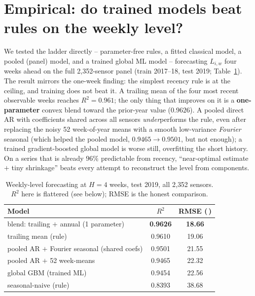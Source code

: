 \documentclass[11pt]{article}
\newcommand{\veh}{\,\text{veh/h}}
\begin{document}
\section{Empirical: do trained models beat rules on the weekly level?}
\label{sec:ladder}
We tested the ladder directly -- parameter-free rules, a fitted classical model, a
pooled (panel) model, and a trained global ML model -- forecasting $L_{i,w}$ four
weeks ahead on the full 2{,}352-sensor panel (train 2017--18, test 2019;
Table~\ref{tab:ladder}). The result mirrors the one-week finding: the simplest
recency rule is at the ceiling, and training does not beat it. A trailing mean of
the four most recent observable weeks reaches $R^2=0.961$; the only thing that
improves on it is a \textbf{one-parameter} convex blend toward the prior-year
value ($0.9626$). A pooled direct AR with coefficients shared across all sensors
\emph{under}performs the rule, even after replacing the noisy 52 week-of-year means
with a smooth low-variance \emph{Fourier} seasonal (which helped the pooled model,
$0.9465\!\to\!0.9501$, but not enough); a trained gradient-boosted global model is
worse still, overfitting the short history. On a series that is already $96\%$
predictable from recency, ``near-optimal estimate $+$ tiny shrinkage'' beats every
attempt to reconstruct the level from components.

\begin{table}[H]\centering
\caption{Weekly-level forecasting at $H{=}4$ weeks, test 2019, all 2{,}352 sensors.
$R^2$ here is flattered (see below); RMSE is the honest comparison.}
\label{tab:ladder}
\begin{tabular}{lcc}
\toprule
Model & $R^2$ & RMSE (\veh) \\
\midrule
blend: trailing $+$ annual (1 parameter)      & \textbf{0.9626} & \textbf{18.66} \\
trailing mean (rule)                          & 0.9610 & 19.06 \\
pooled AR $+$ Fourier seasonal (shared coefs) & 0.9501 & 21.55 \\
pooled AR $+$ 52 week-means                    & 0.9465 & 22.32 \\
global GBM (trained ML)                        & 0.9454 & 22.56 \\
seasonal-naive (rule)                          & 0.8393 & 38.68 \\
\bottomrule
\end{tabular}
\end{table}
\end{document}
